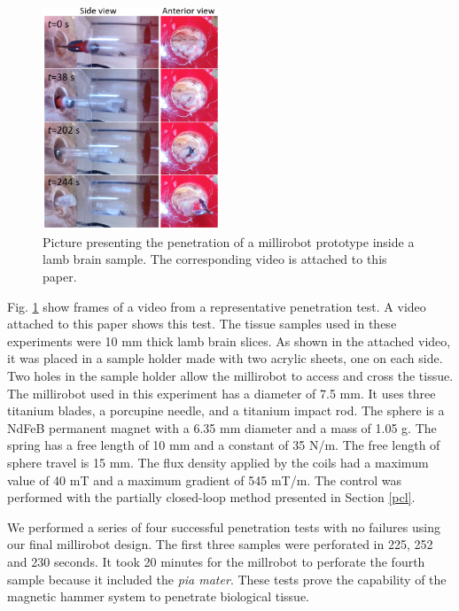 \documentclass[letterpaper, 10 pt, conference]{ieeeconf}  %
\begin{document}
\begin{figure}
	\centering
  \includegraphics[width=150pt]{brain_penetration.png}
  \caption{Picture presenting the penetration of a millirobot prototype inside a lamb brain sample. The corresponding video is attached to this paper.}
  \label{brain_penetration}
	\vspace{-1.5em}
\end{figure}

Fig. \ref{brain_penetration} show frames of a video from a representative penetration test. A video attached to this paper shows this test. The tissue samples used in these experiments were 10 mm thick lamb brain slices. As shown in the attached video, it was placed in a sample holder made with two acrylic sheets, one on each side. Two holes in the sample holder allow the millirobot to access and cross the tissue. The millirobot used in this experiment has a diameter of 7.5 mm. It uses three titanium blades, a porcupine needle, and a titanium impact rod. The sphere is a NdFeB permanent magnet with a 6.35 mm diameter and a mass of 1.05 g. The spring has a free length of 10 mm and a constant of 35 N/m. The free length of sphere travel is 15 mm. The flux density applied by the coils had a maximum value of 40 mT and a maximum gradient of 545 mT/m. The control was performed with the partially closed-loop method presented in Section \ref{pcl}.\par
We performed a series of four successful penetration tests with no failures using our final millirobot design. The first three samples were perforated in 225, 252 and 230 seconds. It took 20 minutes for the millrobot to perforate the fourth sample because it included the \emph{pia mater}. These tests prove the capability of the magnetic hammer system to penetrate biological tissue.
\vspace{-1em}
\end{document}
